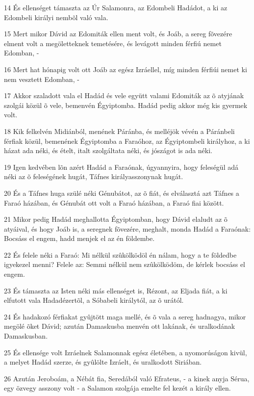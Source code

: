 \par 14 És ellenséget támaszta az Úr Salamonra, az Edombeli Hadádot, a ki az Edombeli királyi nembõl való vala.
\par 15 Mert mikor Dávid az Edomiták ellen ment volt, és Joáb, a sereg fõvezére elment volt a megöletteknek temetésére, és levágott minden férfiú nemet Edomban, -
\par 16 Mert hat hónapig volt ott Joáb az egész Izráellel, míg minden férfiúi nemet ki nem vesztett Edomban, -
\par 17 Akkor szaladott vala el Hadád és vele együtt valami Edomiták az õ atyjának szolgái közül õ vele, bemenvén Égyiptomba. Hadád pedig akkor még kis gyermek volt.
\par 18 Kik felkelvén Midiánból, menének Páránba, és melléjök vévén a Páránbeli férfiak közül, bemenének Égyiptomba a Faraóhoz, az Égyiptombeli királyhoz, a ki házat ada néki, és ételt, italt szolgáltata néki, és jószágot is ada néki.
\par 19 Igen kedvében lõn azért Hadád a Faraónak, úgyannyira, hogy feleségül adá néki az õ feleségének hugát, Táfnes királyasszonynak hugát.
\par 20 És a Táfnes huga szülé néki Génubátot, az õ fiát, és elválasztá azt Táfnes a Faraó házában, és Génubát ott volt a Faraó házában, a Faraó fiai között.
\par 21 Mikor pedig Hadád meghallotta Égyiptomban, hogy Dávid elaludt az õ atyáival, és hogy Joáb is, a seregnek fõvezére, meghalt, monda Hadád a Faraónak: Bocsáss el engem, hadd menjek el az én földembe.
\par 22 És felele néki a Faraó: Mi nélkül szûkölködöl én nálam, hogy a te földedbe igyekezel menni? Felele az: Semmi nélkül nem szûkölködöm, de kérlek bocsáss el engem.
\par 23 És támaszta az Isten néki más ellenséget is, Rézont, az Eljada fiát, a ki elfutott vala Hadadézertõl, a Sóbabeli királytól, az õ urától.
\par 24 És hadakozó férfiakat gyûjtött maga mellé, és õ vala a sereg hadnagya, mikor megölé õket Dávid; azután Damaskusba menvén ott lakának, és uralkodának Damaskusban.
\par 25 És ellensége volt Izráelnek Salamonnak egész életében, a nyomorúságon kivül, a melyet Hadád szerze, és gyûlölte Izráelt, és uralkodott Siriában.
\par 26 Azután Jeroboám, a Nébát fia, Seredából való Efrateus, - a kinek anyja Sérua, egy özvegy asszony volt - a Salamon szolgája emelte fel kezét a király ellen.
